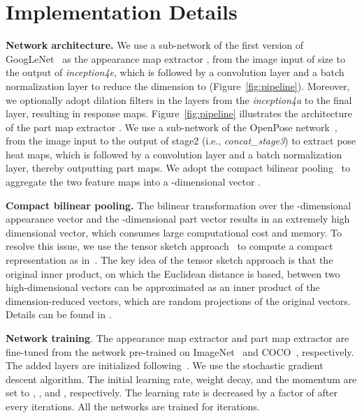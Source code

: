 \documentclass{llncs}
\begin{document}
\section{Implementation Details}
\label{section:implementation_details}
\noindent\textbf{Network architecture.}
We use a sub-network of the first version of GoogLeNet~\cite{googlenet} as the appearance map extractor , 
from the image input of size  to the output of \textit{inception4e}, which is followed by a  convolution layer and a batch normalization layer to reduce the dimension to  (Figure~\ref{fig:pipeline}). Moreover, we optionally adopt dilation filters in the layers from the \textit{inception4a} to the final layer, resulting in  response maps. Figure~\ref{fig:pipeline} illustrates the architecture of the part map extractor . We use a sub-network of the OpenPose network~\cite{conf/cvpr/cao17}, from the image input to the output of stage2 (i.e., \textit{concat\_stage3}) to extract  pose heat maps, which is followed by a  convolution layer and a batch normalization layer, thereby outputting  part maps. 
We adopt the compact bilinear pooling~\cite{conf/cvpr/gao16} to aggregate the two feature maps into a -dimensional vector .

\vspace{0.1cm}
\noindent\textbf{Compact bilinear pooling.}
The bilinear transformation
over the -dimensional appearance vector
and the -dimensional part vector
results in an extremely high dimensional vector,
which consumes large computational cost and memory.
To resolve this issue, we use the tensor sketch approach~\cite{TensorSketch}
to compute a compact representation
as in~\cite{conf/cvpr/gao16}.
The key idea of the tensor sketch approach is that
the original inner product,
on which the Euclidean distance is based,
between two high-dimensional vectors can be approximated
as an inner product of the dimension-reduced vectors,
which are random projections of the original vectors.
Details can be found in \cite{TensorSketch}.

\vspace{0.1cm}
\noindent\textbf{Network training}.
The appearance map extractor  and part map extractor  are fine-tuned from the network pre-trained on ImageNet~\cite{imagenet} and COCO~\cite{coco}, respectively. The added layers are initialized following~\cite{xavier}.
We use the stochastic gradient descent algorithm.
The initial learning rate, weight decay, and the momentum are set to , , and , respectively.
The learning rate is decreased by a factor of  after every  iterations.
All the networks are trained for  iterations.
\end{document}
